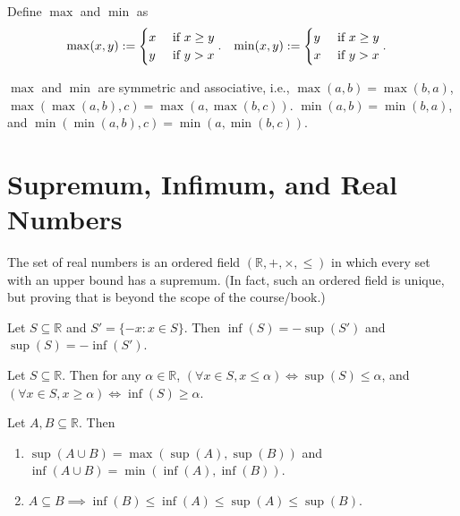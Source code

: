 \documentclass[a4paper, 12pt, fleqn]{article}
\begin{document}
\begin{definition}
Define $\max$ and $\min$ as
\begin{align*}
\max(x, y) &:= \begin{cases}x & \textrm{ if } x \ge y \\ y & \textrm{ if } y > x\end{cases}.
& \min(x, y) &:= \begin{cases}y & \textrm{ if } x \ge y \\ x & \textrm{ if } y > x\end{cases}.
\end{align*}
\end{definition}

\begin{lemma}
$\max$ and $\min$ are symmetric and associative, i.e.,
$\max(a, b) = \max(b, a)$, $\max(\max(a, b), c) = \max(a, \max(b, c))$.
$\min(a, b) = \min(b, a)$, and $\min(\min(a, b), c) = \min(a, \min(b, c))$.
\end{lemma}

\section{Supremum, Infimum, and Real Numbers}

\begin{definition}
The set of real numbers is an ordered field $(\mathbb{R}, +, \times, \le)$
in which every set with an upper bound has a supremum.
(In fact, such an ordered field is unique, but proving that is beyond the scope of the course/book.)
\end{definition}

\begin{lemma}
Let $S \subseteq \mathbb{R}$ and $S' = \{-x: x \in S\}$.
Then $\inf(S) = -\sup(S')$ and $\sup(S) = -\inf(S')$.
\end{lemma}

\begin{lemma}
Let $S \subseteq \mathbb{R}$. Then for any $\alpha \in \mathbb{R}$,
$(\forall x \in S, x \le \alpha) \iff \sup(S) \le \alpha$,
and $(\forall x \in S, x \ge \alpha) \iff \inf(S) \ge \alpha$.
\end{lemma}

\begin{lemma}
Let $A, B \subseteq \mathbb{R}$. Then
\begin{enumerate}
\item $\sup(A \cup B) = \max(\sup(A), \sup(B))$ and $\inf(A \cup B) = \min(\inf(A), \inf(B))$.
\item $A \subseteq B \implies \inf(B) \le \inf(A) \le \sup(A) \le \sup(B)$.
\end{enumerate}
\end{lemma}
\end{document}
